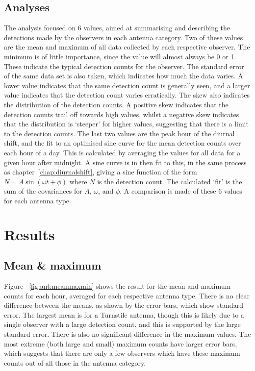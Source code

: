 \subsection{Analyses}
The analysis focused on 6 values, aimed at summarising and describing the detections made by the observers in each antenna category. Two of these values are the mean and maximum of all data collected by each respective observer. The minimum is of little importance, since the value will almost always be 0 or 1. These indicate the typical detection counts for the observer. The standard error of the same data set is also taken, which indicates how much the data varies. A lower value indicates that the same detection count is generally seen, and a larger value indicates that the detection count varies erratically. The skew also indicates the distribution of the detection counts. A positive skew indicates that the detection counts trail off towards high values, whilst a negative skew indicates that the distribution is `steeper' for higher values, suggesting that there is a limit to the detection counts. The last two values are the peak hour of the diurnal shift, and the fit to an optimised sine curve for the mean detection counts over each hour of a day. This is calculated by averaging the values for all data for a given hour after midnight. A sine curve is in then fit to this, in the same process as chapter~\ref{chap:diurnalshift}, giving a sine function of the form $N = A \sin \left( \omega t + \phi \right)$ where $N$ is the detection count. The calculated `fit' is the sum of the covariances for $A$, $\omega$, and $\phi$. A comparison is made of these 6 values for each antenna type.

\section{Results}
\subsection{Mean \& maximum}
Figure ~\ref{fig:ant:meanmaxmin} shows the result for the mean and maximum counts for each hour, averaged for each respective antenna type. There is no clear difference between the means, as shown by the error bars, which show standard error. The largest mean is for a Turnstile antenna, though this is likely due to a single observer with a large detection count, and this is supported by the large standard error. There is also no significant difference in the maximum values. The most extreme (both large and small) maximum counts have larger error bars, which suggests that there are only a few observers which have these maximum counts out of all those in the antenna category.

